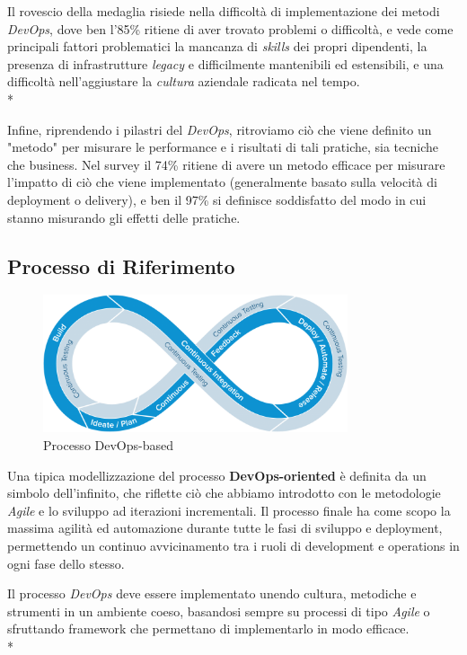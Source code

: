 \documentclass[a4paper,12pt]{report}
\begin{document}
				Il rovescio della medaglia risiede nella difficoltà di implementazione dei metodi \emph{DevOps}, dove ben l'85\% ritiene di aver trovato problemi o difficoltà, e vede come principali fattori problematici la mancanza di \emph{skills} dei propri dipendenti, la presenza di infrastrutture \emph{legacy} e difficilmente mantenibili ed estensibili, e una difficoltà nell'aggiustare la \emph{cultura} aziendale radicata nel tempo.\\*
				
				Infine, riprendendo i pilastri del \emph{DevOps}, ritroviamo ciò che viene definito un "metodo" per misurare le performance e i risultati di tali pratiche, sia tecniche che business. Nel survey il 74\% ritiene di avere un metodo efficace per misurare l'impatto di ciò che viene implementato (generalmente basato sulla velocità di deployment o delivery), e ben il 97\% si definisce soddisfatto del modo in cui stanno misurando gli effetti delle pratiche.
			
			\subsection{Processo di Riferimento}
				
				\begin{figure}[H]
					\centering
					\includegraphics[width=0.8\textwidth]{devops_cycle}
					\caption{Processo DevOps-based}
					\label{fig:devops_cycle}
				\end{figure}
	
				Una tipica modellizzazione del processo \textbf{DevOps-oriented} è definita da un simbolo dell'infinito, che riflette ciò che abbiamo introdotto con le metodologie \emph{Agile} e lo sviluppo ad iterazioni incrementali. Il processo finale ha come scopo la massima agilità ed automazione durante tutte le fasi di sviluppo e deployment, permettendo un continuo avvicinamento tra i ruoli di development e operations in ogni fase dello stesso.
				
				Il processo \emph{DevOps} deve essere implementato unendo cultura, metodiche e strumenti in un ambiente coeso, basandosi sempre su processi di tipo \emph{Agile} o sfruttando framework che permettano di implementarlo in modo efficace.\\*
				
\end{document}
